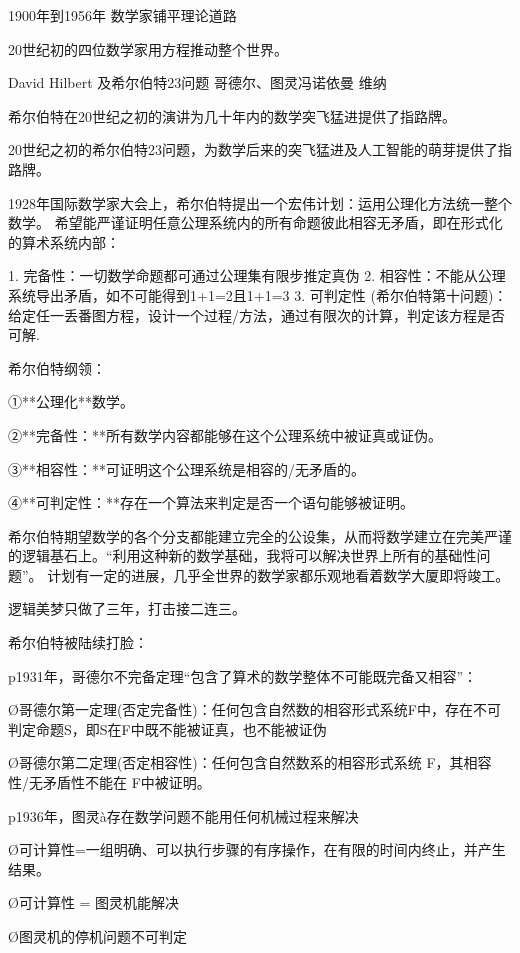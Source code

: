 
1900年到1956年
数学家铺平理论道路

20世纪初的四位数学家用方程推动整个世界。

David Hilbert 及希尔伯特23问题
哥德尔、图灵冯诺依曼  维纳



希尔伯特在20世纪之初的演讲为几十年内的数学突飞猛进提供了指路牌。

20世纪之初的希尔伯特23问题，为数学后来的突飞猛进及人工智能的萌芽提供了指路牌。

1928年国际数学家大会上，希尔伯特提出一个宏伟计划：运用公理化方法统一整个数学。
希望能严谨证明任意公理系统内的所有命题彼此相容无矛盾，即在形式化的算术系统内部：

1. 完备性：一切数学命题都可通过公理集有限步推定真伪
2. 相容性：不能从公理系统导出矛盾，如不可能得到1+1=2且1+1=3
3. 可判定性 (希尔伯特第十问题)： 给定任一丢番图方程，设计一个过程/方法，通过有限次的计算，判定该方程是否可解.



希尔伯特纲领：

①**公理化**数学。

②**完备性：**所有数学内容都能够在这个公理系统中被证真或证伪。

③**相容性：**可证明这个公理系统是相容的/无矛盾的。

④**可判定性：**存在一个算法来判定是否一个语句能够被证明。



希尔伯特期望数学的各个分支都能建立完全的公设集，从而将数学建立在完美严谨的逻辑基石上。“利用这种新的数学基础，我将可以解决世界上所有的基础性问题”。
计划有一定的进展，几乎全世界的数学家都乐观地看着数学大厦即将竣工。

逻辑美梦只做了三年，打击接二连三。



希尔伯特被陆续打脸：

p1931年，哥德尔不完备定理“包含了算术的数学整体不可能既完备又相容”：

Ø哥德尔第一定理(否定完备性)：任何包含自然数的相容形式系统F中，存在不可判定命题S，即S在F中既不能被证真，也不能被证伪

Ø哥德尔第二定理(否定相容性)：任何包含自然数系的相容形式系统 F，其相容性/无矛盾性不能在 F中被证明。

p1936年，图灵à存在数学问题不能用任何机械过程来解决

Ø可计算性=一组明确、可以执行步骤的有序操作，在有限的时间内终止，并产生结果。

Ø可计算性 = 图灵机能解决

Ø图灵机的停机问题不可判定

